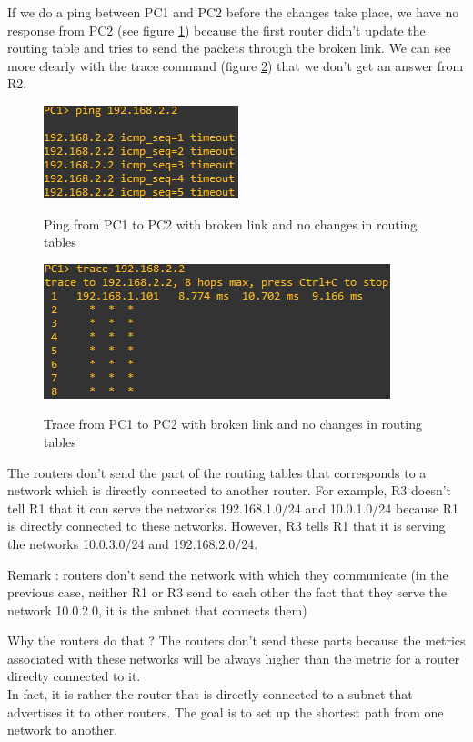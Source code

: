 \documentclass[10pt,a4paper]{ULBreport}
\begin{document}
If we do a ping between PC1 and PC2 before the changes take place, we have no response from PC2 (see figure \ref{routepc1pc2broke}) because the first router didn't update the routing table and tries to send the packets through the broken link. We can see more clearly with the trace command (figure \ref{tracepc1pc2broke}) that we don't get an answer from R2.

\begin{figure}[H]
    \caption{Ping from PC1 to PC2 with broken link and no changes in routing tables}
    \center
    \includegraphics[scale=0.8]{pingPC1PC2broke.png}
    \label{routepc1pc2broke}
\end{figure}

\begin{figure}[H]
    \caption{Trace from PC1 to PC2 with broken link and no changes in routing tables}
    \center
    \includegraphics[scale=0.8]{tracePC1PC2broke.png}
    \label{tracepc1pc2broke}
\end{figure}



The routers don't send the part of the routing tables that corresponds to a network which is directly connected to another router. For example, R3 doesn't tell R1 that it can serve the networks 192.168.1.0/24 and 10.0.1.0/24 because R1 is directly connected to these networks. However, R3 tells R1 that it is serving the networks 10.0.3.0/24 and 192.168.2.0/24.

Remark : routers don't send the network with which they communicate (in the previous case, neither R1 or R3 send to each other the fact that they serve the network 10.0.2.0, it is the subnet that connects them)

Why the routers do that ? The routers don't send these parts because the metrics associated with these networks will be always higher than the metric for a router direclty connected to it. 
\\ In fact, it is rather the router that is directly connected to a subnet that advertises it to other routers. The goal is to set up the shortest path from one network to another.
\end{document}
